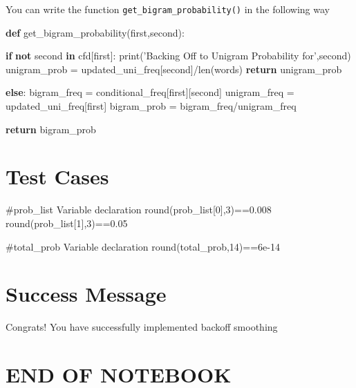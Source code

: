 \documentclass[11pt]{article}
\newenvironment{Shaded}{}{}
\newcommand{\KeywordTok}[1]{\textcolor[rgb]{0.00,0.44,0.13}{\textbf{{#1}}}}
\newcommand{\StringTok}[1]{\textcolor[rgb]{0.25,0.44,0.63}{{#1}}}
\newcommand{\NormalTok}[1]{{#1}}
\newcommand{\ControlFlowTok}[1]{\textcolor[rgb]{0.00,0.44,0.13}{\textbf{{#1}}}}
\newcommand{\OperatorTok}[1]{\textcolor[rgb]{0.40,0.40,0.40}{{#1}}}
\newcommand{\BuiltInTok}[1]{{#1}}
\begin{document}
You can write the function \texttt{get\_bigram\_probability()} in the
following way

\begin{Shaded}
\begin{Highlighting}[]

\KeywordTok{def}\NormalTok{ get_bigram_probability(first,second):}

    \ControlFlowTok{if} \KeywordTok{not}\NormalTok{ second }\KeywordTok{in}\NormalTok{ cfd[first]:}
        \BuiltInTok{print}\NormalTok{(}\StringTok{'Backing Off to Unigram Probability for'}\NormalTok{,second)}
\NormalTok{        unigram_prob }\OperatorTok{=}\NormalTok{ updated_uni_freq[second]}\OperatorTok{/}\BuiltInTok{len}\NormalTok{(words)}
        \ControlFlowTok{return}\NormalTok{ unigram_prob }
    
    \ControlFlowTok{else}\NormalTok{:}
\NormalTok{        bigram_freq }\OperatorTok{=}\NormalTok{ conditional_freq[first][second]}
\NormalTok{        unigram_freq }\OperatorTok{=}\NormalTok{ updated_uni_freq[first]}
\NormalTok{        bigram_prob }\OperatorTok{=}\NormalTok{ bigram_freq}\OperatorTok{/}\NormalTok{unigram_freq}
    
    \ControlFlowTok{return}\NormalTok{ bigram_prob}
\end{Highlighting}
\end{Shaded}

\hypertarget{test-cases}{%
\section{Test Cases}\label{test-cases}}

\#prob\_list Variable declaration round(prob\_list{[}0{]},3)==0.008
round(prob\_list{[}1{]},3)==0.05

\#total\_prob Variable declaration round(total\_prob,14)==6e-14

    \hypertarget{success-message}{%
\section{Success Message}\label{success-message}}

Congrats! You have successfully implemented backoff smoothing

    \hypertarget{end-of-notebook}{%
\section{END OF NOTEBOOK}\label{end-of-notebook}}
\end{document}
